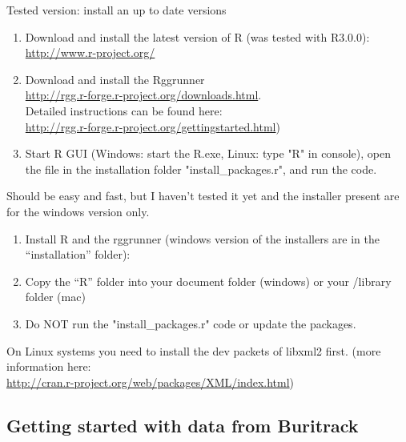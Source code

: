 \documentclass[11pt,a4paper]{article}
\begin{document}
Tested version: install an up to date versions
\begin{enumerate}
\item Download and install the latest version of R (was tested with R3.0.0): \\
\url{http://www.r-project.org/}
\item Download and install the Rggrunner \\ \url{http://rgg.r-forge.r-project.org/downloads.html}. \\  Detailed instructions can be found here: \\
\url{http://rgg.r-forge.r-project.org/gettingstarted.html})
\item Start R GUI (Windows: start the R.exe, Linux: type "R" in console), open the file in the installation folder "install\_packages.r", and run the code.

\end{enumerate}
Should be easy and fast, but I haven't tested it yet and the installer present are for the windows version only.
\begin{enumerate}
\item Install R and the rggrunner (windows version of the installers are in the "`installation"' folder): \\

\item Copy the "`R"' folder into your document folder (windows) or your /library folder (mac) \\

\item Do NOT run the "install\_packages.r" code or update the packages.

\end{enumerate}

On Linux systems you need to install the dev packets of libxml2 first.
(more information here: \\ \url{http://cran.r-project.org/web/packages/XML/index.html})

\subsection{Getting started with data from Buritrack}
\end{document}
